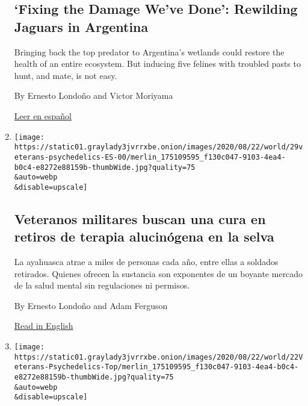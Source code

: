 \begin{enumerate}
  \hypertarget{fixing-the-damage-weve-done-rewilding-jaguars-in-argentina}{%
  \subsection{`Fixing the Damage We've Done': Rewilding Jaguars in
  Argentina}\label{fixing-the-damage-weve-done-rewilding-jaguars-in-argentina}}

  Bringing back the top predator to Argentina's wetlands could restore
  the health of an entire ecosystem. But inducing five felines with
  troubled pasts to hunt, and mate, is not easy.

  By Ernesto Londoño and Victor Moriyama

  \href{https://www.nytimes3xbfgragh.onion/es/2020/09/01/espanol/america-latina/ibera-conservacion-jaguares-argentina.html}{Leer
  en español}
\item
  \href{/es/2020/08/30/espanol/america-latina/ayahuasca-costa-rica.html}{}

  \texttt{[image: https://static01.graylady3jvrrxbe.onion/images/2020/08/22/world/29veterans-psychedelics-ES-00/merlin\_175109595\_f130c047-9103-4ea4-b0c4-e8272e88159b-thumbWide.jpg?quality=75\\\&auto=webp\\\&disable=upscale]}

  \hypertarget{veteranos-militares-buscan-una-cura-en-retiros-de-terapia-alucinuxf3gena-en-la-selva}{%
  \subsection{Veteranos militares buscan una cura en retiros de terapia
  alucinógena en la
  selva}\label{veteranos-militares-buscan-una-cura-en-retiros-de-terapia-alucinuxf3gena-en-la-selva}}

  La ayahuasca atrae a miles de personas cada año, entre ellas a
  soldados retirados. Quienes ofrecen la sustancia son exponentes de un
  boyante mercado de la salud mental sin regulaciones ni permisos.

  By Ernesto Londoño and Adam Ferguson

  \href{https://www.nytimes3xbfgragh.onion/2020/08/30/world/americas/psychedelics-therapy-war-stress.html}{Read
  in English}
\item
  \href{/2020/08/30/world/americas/psychedelics-therapy-war-stress.html}{}

  \texttt{[image: https://static01.graylady3jvrrxbe.onion/images/2020/08/22/world/22Veterans-Psychedelics-Top/merlin\_175109595\_f130c047-9103-4ea4-b0c4-e8272e88159b-thumbWide.jpg?quality=75\\\&auto=webp\\\&disable=upscale]}


\end{enumerate}
